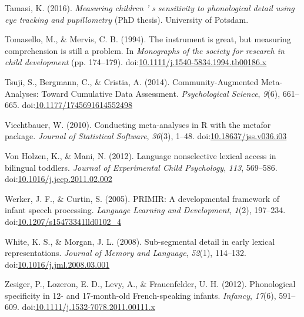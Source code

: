\documentclass[man]{apa6}
\begin{document}
\leavevmode\hypertarget{ref-Tamasi2016}{}%
Tamasi, K. (2016). \emph{Measuring children ' s sensitivity to phonological detail using eye tracking and pupillometry} (PhD thesis). University of Potsdam.

\leavevmode\hypertarget{ref-Tomasello1994}{}%
Tomasello, M., \& Mervis, C. B. (1994). The instrument is great, but measuring comprehension is still a problem. In \emph{Monographs of the society for research in child development} (pp. 174--179). doi:\href{https://doi.org/10.1111/j.1540-5834.1994.tb00186.x}{10.1111/j.1540-5834.1994.tb00186.x}

\leavevmode\hypertarget{ref-Tsuji2014}{}%
Tsuji, S., Bergmann, C., \& Cristia, A. (2014). Community-Augmented Meta-Analyses: Toward Cumulative Data Assessment. \emph{Psychological Science}, \emph{9}(6), 661--665. doi:\href{https://doi.org/10.1177/1745691614552498}{10.1177/1745691614552498}

\leavevmode\hypertarget{ref-metafor}{}%
Viechtbauer, W. (2010). Conducting meta-analyses in R with the metafor package. \emph{Journal of Statistical Software}, \emph{36}(3), 1--48. doi:\href{https://doi.org/10.18637/jss.v036.i03}{10.18637/jss.v036.i03}

\leavevmode\hypertarget{ref-VonHolzen2012}{}%
Von Holzen, K., \& Mani, N. (2012). Language nonselective lexical access in bilingual toddlers. \emph{Journal of Experimental Child Psychology}, \emph{113}, 569--586. doi:\href{https://doi.org/10.1016/j.jecp.2011.02.002}{10.1016/j.jecp.2011.02.002}

\leavevmode\hypertarget{ref-Werker2005}{}%
Werker, J. F., \& Curtin, S. (2005). PRIMIR: A developmental framework of infant speech processing. \emph{Language Learning and Development}, \emph{1}(2), 197--234. doi:\href{https://doi.org/10.1207/s15473341lld0102_4}{10.1207/s15473341lld0102\_4}

\leavevmode\hypertarget{ref-White2008}{}%
White, K. S., \& Morgan, J. L. (2008). Sub-segmental detail in early lexical representations. \emph{Journal of Memory and Language}, \emph{52}(1), 114--132. doi:\href{https://doi.org/10.1016/j.jml.2008.03.001}{10.1016/j.jml.2008.03.001}

\leavevmode\hypertarget{ref-Zesiger2012}{}%
Zesiger, P., Lozeron, E. D., Levy, A., \& Frauenfelder, U. H. (2012). Phonological specificity in 12- and 17-month-old French-speaking infants. \emph{Infancy}, \emph{17}(6), 591--609. doi:\href{https://doi.org/10.1111/j.1532-7078.2011.00111.x}{10.1111/j.1532-7078.2011.00111.x}

\endgroup
\end{document}
